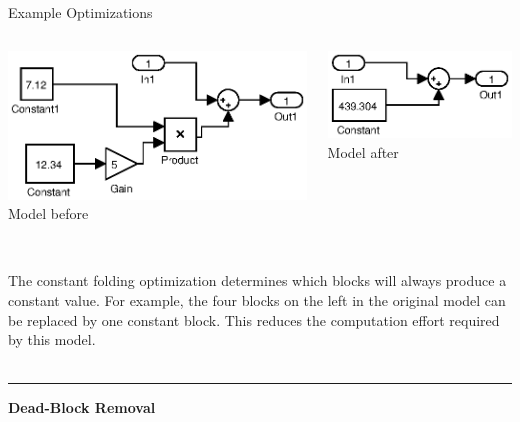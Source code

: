 \documentclass[final,hyperref={pdfpagelabels=false}]{beamer}
\begin{document}
\begin{frame}{}
\begin{columns}[t]
\begin{column}{.585\linewidth}
\begin{block}{Example Optimizations}
\begin{columns}[c]
\begin{column}{.485\linewidth}
\begin{center}
        \includegraphics[width=0.8\linewidth]{images/models/Const1}\\
        \footnotesize Model before
        \end{center}
        \end{column}
        \begin{column}{.485\linewidth}
        \begin{center}
        \includegraphics[width=0.8\linewidth]{images/models/Const1_export}\\
        \footnotesize Model after
        \end{center}
        \end{column}
        \end{columns}
        \footnotesize ~\\
        The constant folding optimization determines which blocks will always produce a constant value. For example, the four blocks on the left in the original model can be replaced by one constant block. This reduces the computation effort required by this model.
         ~\\~\\
         \hrule
         \small
          \begin{center}\textbf{Dead-Block Removal}\end{center}
                 
         \begin{columns}[c]
         \begin{column}{.485\linewidth}
         \begin{center}
         

\end{center}
\end{column}
\end{columns}
\end{block}
\end{column}
\end{columns}
\end{frame}
\end{document}

